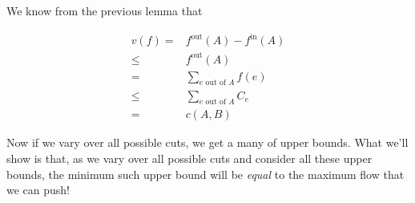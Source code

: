 \documentclass[12pt]{article}
\begin{document}
  {
    We know from the previous lemma that

    \begin{align*}
      v(f) =&f^\text{out}(A) - f^\text{in}(A) \\
         \le&f^\text{out}(A) \\
           =& \sum_{e \text{ out of } A} f(e) \\
           \le&\sum_{e \text{ out of } A} C_e \\
           =&c(A, B)
    \end{align*}
  }

  Now if we vary over all possible cuts, we get a many of upper bounds. What
  we'll show is that, as we vary over all possible cuts and consider all these
  upper bounds, the minimum such upper bound will be {\it equal} to the maximum
  flow that we can push!

  
\end{document}
